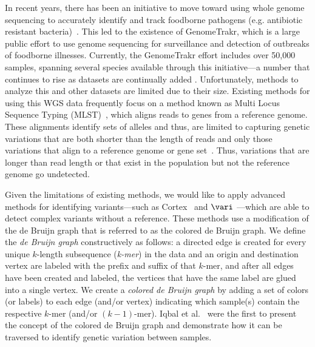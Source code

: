 

 In recent years, there has been an initiative to move toward using whole genome sequencing to accurately identify and track foodborne pathogens (e.g. antibiotic resistant bacteria)~\cite{carleton2016whole}. This led to the existence of GenomeTrakr, which is a large public effort to use genome sequencing for surveillance and detection of outbreaks of foodborne illnesses. Currently, the GenomeTrakr effort includes over 50,000 samples, spanning several species available through this initiative---a number that continues to rise as datasets are continually added \cite{genometrakr}.  Unfortunately, methods to analyze this and other datasets are limited due to their size.   Existing methods for using this WGS data frequently focus on a method known as Multi Locus Sequence Typing (MLST)~\cite{pettengill2016}, which aligns reads to genes from a reference genome.  These alignments identify sets of alleles and thus, are limited to capturing genetic variations that are both shorter than the length of reads and only those variations that align to a reference genome or gene set~\cite{maiden2013mlst}.  Thus, variations that are longer than read length or that exist in the population but not the reference genome go undetected.

Given the limitations of existing methods, we would like to apply advanced methods for identifying variants---such as Cortex~\cite{ICTFM12} and $\vari$ \cite{vari}---which are able to detect complex variants without a reference. These methods use a modification of the de Bruijn graph that is referred to as the colored de Bruijn graph.   We define the {\em de Bruijn graph} constructively as follows: a directed edge is created for every unique $k$-length subsequence ({\em k-mer}) in the data and an origin and destination vertex are labeled with the prefix and suffix of that $k$-mer, and after all edges have been created and labeled, the vertices that have the same label are glued into a single vertex.  We create a {\em colored de Bruijn graph} by adding a set of colors (or labels) to each edge (and/or vertex) indicating which sample(s) contain the respective $k$-mer (and/or $(k - 1)$-mer).  Iqbal et al.~\cite{ICTFM12} were the first to present the concept of the colored de Bruijn graph and demonstrate how it can be traversed to identify genetic variation between samples.  

